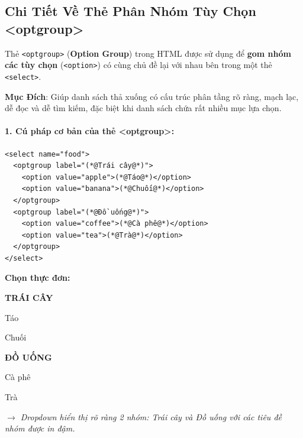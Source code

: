 \documentclass[11pt,oneside]{book}
\newcommand{\codeinline}[1]{\textcolor{accentOrange}{\texttt{#1}}}
\newcommand{\term}[1]{\textbf{\textcolor{primaryBlue}{#1}}}
\begin{document}
\subsection{Chi Tiết Về Thẻ Phân Nhóm Tùy Chọn <optgroup>}

\begin{conceptBox}
Thẻ \codeinline{<optgroup>} (\term{Option Group}) trong HTML được sử dụng để \textbf{gom nhóm các tùy chọn} (\codeinline{<option>}) có cùng chủ đề lại với nhau bên trong một thẻ \codeinline{<select>}.
\par\vspace{4pt}
\textbf{ Mục Đích}: Giúp danh sách thả xuống có cấu trúc phân tầng rõ ràng, mạch lạc, dễ đọc và dễ tìm kiếm, đặc biệt khi danh sách chứa rất nhiều mục lựa chọn.
\end{conceptBox}

\paragraph{1. Cú pháp cơ bản của thẻ <optgroup>:}

\begin{codeWindow}
\begin{lstlisting}[language=HTML5]
<select name="food">
  <optgroup label="(*@Trái cây@*)">
    <option value="apple">(*@Táo@*)</option>
    <option value="banana">(*@Chuối@*)</option>
  </optgroup>
  <optgroup label="(*@Đồ uống@*)">
    <option value="coffee">(*@Cà phê@*)</option>
    <option value="tea">(*@Trà@*)</option>
  </optgroup>
</select>
\end{lstlisting}
\end{codeWindow}

\begin{browserWindow}
\sffamily\small
\textbf{Chọn thực đơn:} \par\vspace{4pt}
\begin{tcolorbox}[arc=2pt, colback=white, colframe=primaryBlue!50, boxsep=4pt, width=0.6\linewidth]
  \small
  \textbf{\textcolor{gray!80}{TRÁI CÂY}} \par\vspace{2pt}
  \quad Táo \par\vspace{2pt}
  \quad Chuối \par\vspace{3pt}
  \textbf{\textcolor{gray!80}{ĐỒ UỐNG}} \par\vspace{2pt}
  \quad Cà phê \par\vspace{2pt}
  \quad Trà
\end{tcolorbox}
\par\vspace{4pt}
\textcolor{codeComment}{\small\textit{$\rightarrow$ Dropdown hiển thị rõ ràng 2 nhóm: Trái cây và Đồ uống với các tiêu đề nhóm được in đậm.}}
\end{browserWindow}
\end{document}

